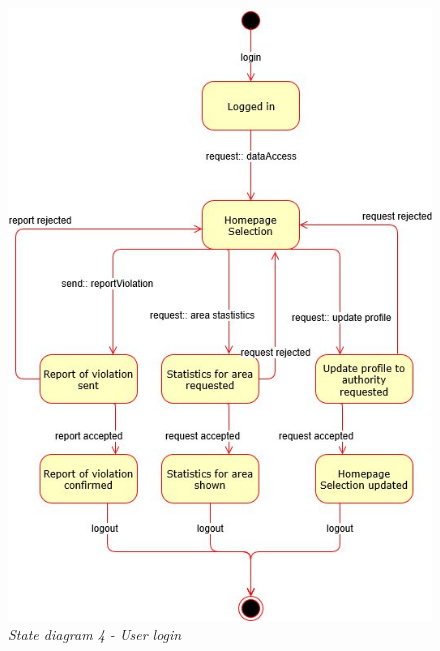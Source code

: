 \begin{figure}[ht!]
  \centering
  \includegraphics[width=7 cm]{RASD_Images/StateDiagrams/state4.jpg}
  \caption{\textit{State diagram 4 - User login}}
\end{figure}
\newpage